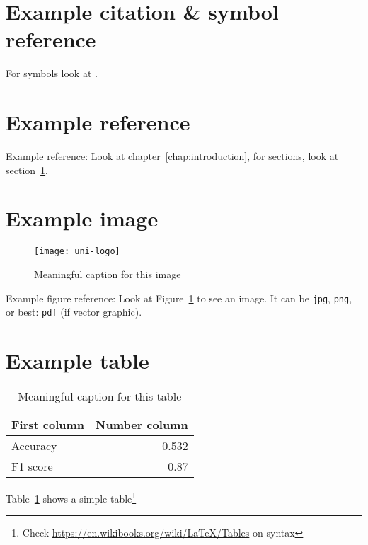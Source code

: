 \section{Example citation \& symbol reference}\label{sec:citation}
For symbols look at \cite{latex_symbols_2017}.


\section{Example reference}
Example reference: Look at chapter~\ref{chap:introduction}, for sections, look at section~\ref{sec:citation}.

\section{Example image}

\begin{figure}
	\centering
	\texttt{[image: uni-logo]}
	\caption{Meaningful caption for this image}
	\label{fig:uniLogo}
\end{figure}

Example figure reference: Look at Figure~\ref{fig:uniLogo} to see an image. It can be \texttt{jpg}, \texttt{png}, or best: \texttt{pdf} (if vector graphic).

\section{Example table}

\begin{table}
	\centering
	\begin{tabular}{lr}
		First column & Number column \\
		\hline
		Accuracy & 0.532 \\
		F1 score & 0.87
	\end{tabular}
	\caption{Meaningful caption for this table}
	\label{tab:result}
\end{table}

Table~\ref{tab:result} shows a simple table\footnote{Check \url{https://en.wikibooks.org/wiki/LaTeX/Tables} on syntax}